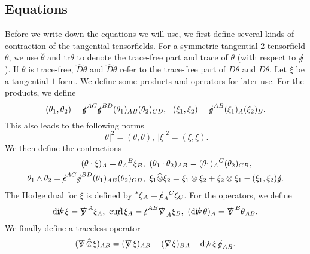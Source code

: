 \documentclass[11pt,reqno]{amsart}
\theoremstyle{definition}
\numberwithin{equation}{section}
\newcommand{\tr}{\mathrm{tr}}
\def\tr{\mathrm{tr}}
\def\tensor{\widehat{\otimes}}
\newcommand{\Db}{\underline{D}}
\newcommand{\Dh}{\widehat{D}}
\newcommand{\Dbh}{\widehat{\underline{D}}}
\def\nablas{\mbox{$\nabla \mkern -13mu /$ }}
\def\divs{\mbox{$\mathrm{div} \mkern -13mu /$ }}
\def\curls{\mbox{$\mathrm{curl} \mkern -13mu /$ }}
\def\gs{\mbox{$g \mkern -9mu /$}}
\def\epsilons{\mbox{$\epsilon \mkern -9mu /$}}
\begin{document}
\subsection{Equations}
Before we write down the equations we will use, we first define several kinds of contraction of the tangential tensorfields. For a  symmetric tangential 2-tensorfield $\theta$, we use $\widehat{\theta}$ and $\tr\theta$ to denote the trace-free part and trace of $\theta$ (with respect to $\gs$). If $\theta$ is trace-free, $\Dh\theta$ and $\Dbh\theta$ refer to the trace-free part of $D\theta$ and $\Db\theta$. Let $\xi$ be a tangential $1$-form. We define some products and operators for later use. For the products, we define 
$$(\theta_1,\theta_2)=\gs^{AC}\gs^{BD}(\theta_1)_{AB}(\theta_2)_{CD},\ \ (\xi_1,\xi_2)=\gs^{AB}(\xi_1)_A(\xi_2)_B.$$ This also leads to the following norms 
$$|\theta|^2=(\theta,\theta),\ |\xi|^2=(\xi,\xi).$$ We then define the contractions 
\begin{align*}(\theta\cdot\xi)_A=\theta_A{}^B\xi_B&,\ (\theta_1\cdot \theta_2)_{AB}=(\theta_1)_A{}^C(\theta_2)_{CB},\\
 \theta_1 \wedge\theta_2=\epsilons^{AC}\gs^{BD} (\theta_1)_{AB}(\theta_2)_{CD}&,\ \xi_1\tensor \xi_2=\xi_1\otimes\xi_2+\xi_2\otimes\xi_1-(\xi_1,\xi_2)\gs.
\end{align*} The Hodge dual for $\xi$ is defined by $\prescript{*}{}\xi_A=\epsilons_A{}^C\xi_C$. For the operators, we define 
$$\divs\xi=\nablas^A\xi_A,\ \curls\xi_A=\epsilons^{AB}\nablas_A\xi_B,\ (\divs\theta)_A=\nablas^B\theta_{AB}.$$ We finally define a traceless operator $$(\nablas\tensor\xi)_{AB}=(\nablas\xi)_{AB}+(\nablas\xi)_{BA}-\divs\xi \,\gs_{AB}.$$

\end{document}
